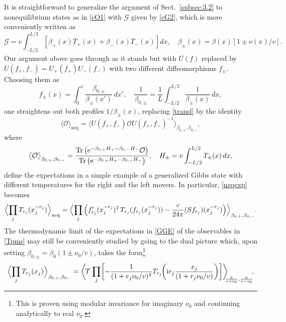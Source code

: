 \documentclass[12pt,a4paper]{article}
\newcommand{\ee}{{\rm e}}
\newcommand{\ii}{{\rm i}}
\newcommand{\cG}{\mathcal{G}}
\newcommand{\cO}{\mathcal{O}}
\newcommand{\cT}{\mathcal{T}}
\def\Tr{\operatorname{Tr}}
\theoremstyle{definition}
\theoremstyle{remark}
\begin{document}
It is straightforward to generalize the argument of
Sect.~\ref{subsec:3.2} to nonequilibrium states as in \eqref{cO1} with
$\cG$ given by \eqref{cG2}, which is more conveniently written as
%
\begin{equation} 
\label{cGpm}
\cG = v\int_{-L/2}^{L/2} \left[ \beta_{+}(x)T_{+}(x)+\beta_{-}(x)T_{-}(x) \right] dx,
\quad  
\beta_{\pm}(x) = \beta(x) \left[ 1 \pm \nu(x)/v \right]. 
\end{equation}
%
Our argument above goes through as it stands but with $U(f)$ replaced by $U(f_+,f_-)= U_{+}(f_+)U_{-}(f_-)$ with two different diffeomorphisms $f_{\pm}$.
Choosing them as 
%
\begin{equation} 
\label{fpm}
f_{\pm}(x) = \int_{0}^x \frac{\beta_{0,\pm}}{\beta_{\pm}(x')} \, dx',
\quad
\frac{1}{\beta_{0,\pm}} = \frac{1}{L}\int_{-L/2}^{L/2}\frac1{\beta_{\pm}(x)} \, dx, 
\end{equation} 
%
one straightens out both profiles $1/\beta_{\pm}(x)$, replacing \eqref{transl} by the identity
%
\begin{equation}
\label{translnu}
\big\langle\cO\big\rangle_{\text{neq}}
= \big\langle U(f_+,f_-)\cO U(f_+,f_-)^{-1} \big\rangle_{\beta_{0,+},\beta_{0,-}},
\end{equation}
%
where
%
\begin{equation}
\label{GGE}  
\bigl\langle \cO\bigr\rangle_{\beta_{0,+},\beta_{0,-}}
= \frac{ \Tr\big(\ee^{-\beta_{0,+}H_{+} - \beta_{0,-}H_{-}}\cO\big)}
		{ \Tr\big(\ee^{-\beta_{0,+}H_{+} - \beta_{0,-}H_{-}}\big)},
\quad
H_{\pm}
= v \int_{-L/2}^{L/2} T_{\pm}(x) \, dx,
\end{equation}
%
define the expectations in a simple example of a generalized Gibbs state
with different temperatures for the right and the left movers.
In particular, \eqref{neqexp} becomes
%
\begin{equation}
\label{neqexpd} 
\Bigl\langle \prod_{j}T_{r_j}(x_j^{-r_j}) \Bigr\rangle_{\text{neq}}
= \Bigl\langle \prod_{j} \left( f'_{r_j}(x_j^{-r_j})^2\,T_{r_j}(f_{r_j}(x_j^{-r_j}))
- \frac{c}{24\pi}(Sf_{r_j})(x_j^{-r_j}) \right)
\Bigr\rangle_{\beta_{0,+},\beta_{0,-}}.  
\end{equation}
%
The thermodynamic limit of the expectations in \eqref{GGE} of the observables in \eqref{Tpms} may still be conveniently studied by going to the dual picture which, upon setting $\beta_{0,\pm} = \beta_0 (1 \pm {\nu_0}/{v})$, takes the form\footnote{This is proven using modular invariance for imaginary $\nu_0$ and continuing analytically to real $\nu_0$.} 
%
\begin{equation}
\label{dualtau}
\hspace*{-0.3cm}
\Bigl\langle \prod_{j} T_{r_j}(x_j) \Bigr\rangle_{\beta_{0,+},\beta_{0,-}} \! 
= \biggl\langle\hspace{-0.05cm}\cT \prod_{j}\hspace{-0.05cm}
        \left[
		- \frac{1}{{(1+r_j{\nu_0}/{v})^{2}}}
		T_{r_j}\hspace{-0.1cm}
                \left( \ii r_j \frac{{x_j}}{{(1+r_j{\nu_0}/{v})}} \right)
	\right]
	\biggr\rangle_{\hspace{-0.15cm}\frac{L}{v+\nu_0}, \frac{L}{v-\nu_0}}\hspace{-0.1cm},\hspace*{-0.3cm}
\end{equation}
\end{document}
